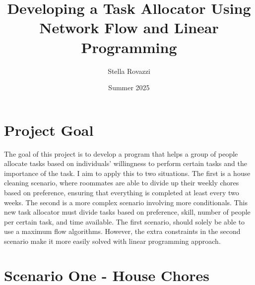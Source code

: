 \documentclass{article}
\title{Developing a Task Allocator Using Network Flow and Linear Programming}
\author{Stella Rovazzi}
\date{Summer 2025}
\newcommand\tab[1][1cm]{\hspace*{#1}}
\begin{document}
\maketitle

\section*{Project Goal}
\tab The goal of this project is to develop a program that helps a group of people allocate tasks based on individuals' willingness to perform certain tasks and 
the importance of the task. I aim to apply this to two situations. The first is a house cleaning scenario, where roommates are able to divide up their weekly chores based on preference, ensuring
that everything is completed at least every two weeks. The second is a more complex scenario involving more conditionals. This new task allocator must divide
tasks based on preference, skill, number of people per certain task, and time available. The first scenario, should solely be able to use a maximum flow algorithms. However, the extra constraints
 in the second scenario make it more easily solved with linear programming approach.

\section*{Scenario One - House Chores}
\end{document}
